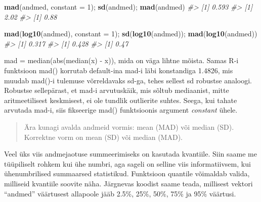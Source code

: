 \documentclass[]{book}
\newenvironment{Shaded}{\begin{snugshade}}{\end{snugshade}}
\newcommand{\KeywordTok}[1]{\textcolor[rgb]{0.13,0.29,0.53}{\textbf{#1}}}
\newcommand{\DataTypeTok}[1]{\textcolor[rgb]{0.13,0.29,0.53}{#1}}
\newcommand{\DecValTok}[1]{\textcolor[rgb]{0.00,0.00,0.81}{#1}}
\newcommand{\FloatTok}[1]{\textcolor[rgb]{0.00,0.00,0.81}{#1}}
\newcommand{\CommentTok}[1]{\textcolor[rgb]{0.56,0.35,0.01}{\textit{#1}}}
\newcommand{\NormalTok}[1]{#1}
\begin{document}
\begin{Shaded}
\begin{Highlighting}[]
\KeywordTok{mad}\NormalTok{(andmed, }\DataTypeTok{constant =} \DecValTok{1}\NormalTok{); }\KeywordTok{sd}\NormalTok{(andmed); }\KeywordTok{mad}\NormalTok{(andmed)}
\CommentTok{#> [1] 0.593}
\CommentTok{#> [1] 2.02}
\CommentTok{#> [1] 0.88}
\end{Highlighting}
\end{Shaded}

\begin{Shaded}
\begin{Highlighting}[]
\KeywordTok{mad}\NormalTok{(}\KeywordTok{log10}\NormalTok{(andmed), }\DataTypeTok{constant =} \DecValTok{1}\NormalTok{); }\KeywordTok{sd}\NormalTok{(}\KeywordTok{log10}\NormalTok{(andmed)); }\KeywordTok{mad}\NormalTok{(}\KeywordTok{log10}\NormalTok{(andmed))}
\CommentTok{#> [1] 0.317}
\CommentTok{#> [1] 0.428}
\CommentTok{#> [1] 0.47}
\end{Highlighting}
\end{Shaded}

mad = median(abs(median(x) - x)), mida on väga lihtne mõista. Samas R-i
funktsioon mad() korrutab default-ina mad-i läbi konstandiga 1.4826, mis
muudab mad()-i tulemuse võrreldavaks sd-ga, tehes sellest sd robustse
analoogi. Robustse sellepärast, et mad-i arvutuskäik, mis sõltub
mediaanist, mitte aritmeetilisest keskmisest, ei ole tundlik outlierite
suhtes. Seega, kui tahate arvutada mad-i, siis fikseerige mad()
funktsioonis argument \emph{constant} ühele.

\begin{quote}
Ära kunagi avalda andmeid vormis: mean (MAD) või median (SD). Korrektne
vorm on mean (SD) või median (MAD).
\end{quote}

Veel üks viis andmejaotuse summeerimiseks on kasutada kvantiile. Siin
saame me tüüpiliselt rohkem kui ühe numbri, aga sageli on selline viis
informatiivsem, kui ühenumbrilised summaarsed statistikud. Funktsioon
quantile võimaldab valida, milliseid kvantiile soovite näha. Järgnevas
koodist saame teada, millisest vektori ``andmed'' väärtusest allapoole
jääb 2.5\%, 25\%, 50\%, 75\% ja 95\% väärtusi.

\begin{Shaded}
\end{Shaded}
\end{document}
